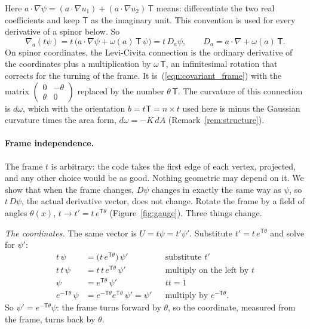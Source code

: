 Here $a\cdot\nabla\psi = (a\cdot\nabla u_1) + (a\cdot\nabla u_2)\,\mathsf T$ means: differentiate the two real coefficients and keep $\mathsf T$ as the imaginary unit. This convention is used for every derivative of a spinor below. So
\begin{equation}
\label{eqn:ga_covariant}
\nabla_a (t \psi) = t\, \big( a \cdot \nabla \psi + \omega(a)\, \mathsf T\, \psi \big) = t\, D_a \psi, \qquad D_a = a \cdot \nabla + \omega(a)\, \mathsf T .
\end{equation}
On spinor coordinates, the Levi-Civita connection is the ordinary derivative of the coordinates plus a multiplication by $\omega\,\mathsf T$, an infinitesimal rotation that corrects for the turning of the frame. It is~(\ref{eqn:covariant_frame}) with the matrix $\begin{pmatrix}0 & -\theta\\ \theta & 0\end{pmatrix}$ replaced by the number $\theta\,\mathsf T$. The curvature of this connection is $d\omega$, which with the orientation $b = t\mathsf T = n \times t$ used here is minus the Gaussian curvature times the area form, $d\omega = -K\, dA$ \cite{Knoppel2013} (Remark~\ref{rem:structure}).

\paragraph{Frame independence.} The frame $t$ is arbitrary: the code takes the first edge of each vertex, projected, and any other choice would be as good. Nothing geometric may depend on it. We show that when the frame changes, $D\psi$ changes in exactly the same way as $\psi$, so $t\,D\psi$, the actual derivative vector, does not change. Rotate the frame by a field of angles $\theta(x)$, $t \to t' = t\, e^{\mathsf T \theta}$ (Figure~\ref{fig:gauge}). Three things change.

\emph{The coordinates.} The same vector is $U = t\psi = t' \psi'$. Substitute $t' = t\,e^{\mathsf T\theta}$ and solve for $\psi'$:
\begin{align*}
t\,\psi &= \big(t\, e^{\mathsf T\theta}\big)\,\psi' && \text{substitute } t' \\
t\,t\,\psi &= t\,t\, e^{\mathsf T\theta}\,\psi' && \text{multiply on the left by } t \\
\psi &= e^{\mathsf T\theta}\,\psi' && tt = 1 \\
e^{-\mathsf T\theta}\,\psi &= e^{-\mathsf T\theta}e^{\mathsf T\theta}\,\psi' = \psi' && \text{multiply by } e^{-\mathsf T\theta} .
\end{align*}
So $\psi' = e^{-\mathsf T \theta} \psi$: the frame turns forward by $\theta$, so the coordinate, measured from the frame, turns back by $\theta$.

